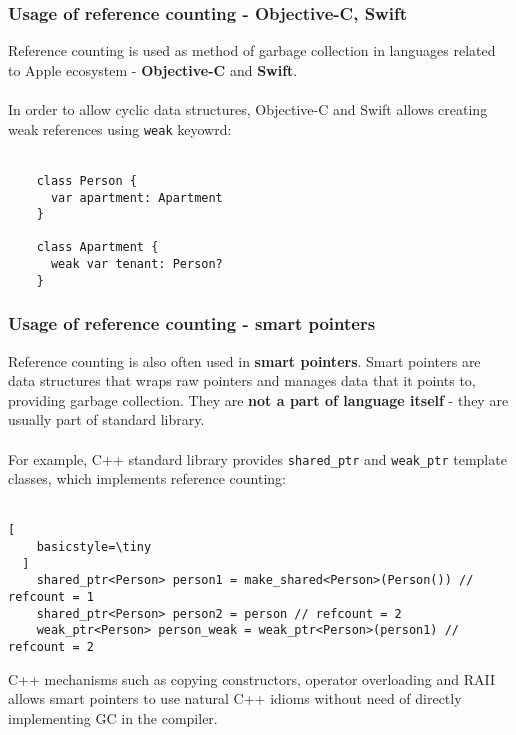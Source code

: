 \documentclass[presentation]{beamer}
\begin{document}
\begin{frame}
\begin{columns}
\begin{column}{0.5\textwidth}
    \end{column}
  \end{columns}
\end{frame}

\begin{frame}[fragile]
  \frametitle{Usage of reference counting - Objective-C, Swift} 
  \justifying
  Reference counting is used as method of garbage collection in languages related to Apple ecosystem - \textbf{Objective-C} and \textbf{Swift}.
  \\~\\
  In order to allow cyclic data structures, Objective-C and Swift allows creating weak references using \texttt{weak} keyowrd:
  \\~\\
  \begin{lstlisting}
    class Person {
      var apartment: Apartment
    }

    class Apartment {
      weak var tenant: Person?
    }\end{lstlisting}
\end{frame}

\begin{frame}[fragile]
  \frametitle{Usage of reference counting - smart pointers} 
  \justifying
  Reference counting is also often used in \textbf{smart pointers}. Smart pointers are data structures that wraps raw pointers and manages data that it points to, providing garbage collection. They are \textbf{not a part of language itself} - they are usually part of standard library. 
  \\~\\
  For example, C++ standard library provides \texttt{shared\_ptr} and \texttt{weak\_ptr} template classes, which implements reference counting:
  \\~\\
  \begin{lstlisting}[
    basicstyle=\tiny
  ]
    shared_ptr<Person> person1 = make_shared<Person>(Person()) // refcount = 1
    shared_ptr<Person> person2 = person // refcount = 2
    weak_ptr<Person> person_weak = weak_ptr<Person>(person1) // refcount = 2\end{lstlisting}
  C++ mechanisms such as copying constructors, operator overloading and RAII allows smart pointers to use natural C++ idioms without need of directly implementing GC in the compiler.
\end{frame}
\end{document}
